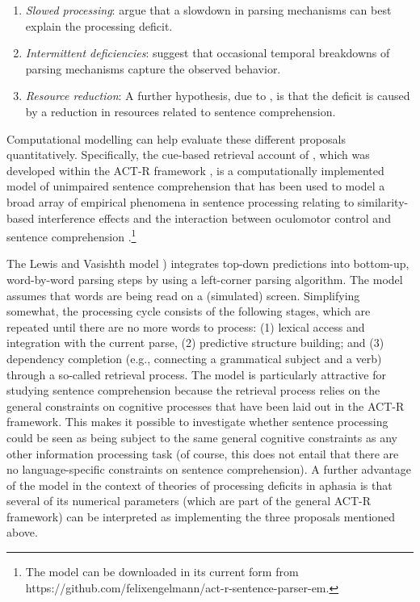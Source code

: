 \documentclass{cambridge7A}\usepackage[]{graphicx}\usepackage[]{color}
\begin{document}
\begin{enumerate}
 \item \textit{Slowed processing}:
  \cite{BurkhardtEtAl2003} argue that a slowdown in parsing mechanisms can best explain the processing deficit.  
\ \item \textit{Intermittent deficiencies}:
  \cite{CaplanEtAl2015} suggest that occasional temporal breakdowns of parsing mechanisms capture the observed behavior. 
  \item \textit{Resource reduction}:
  A further hypothesis, due to \cite{Caplan2012}, is that the deficit is caused by a reduction in resources related to sentence comprehension. 
\end{enumerate} 

Computational modelling can help evaluate these different proposals quantitatively. 
Specifically, the cue-based retrieval account of \cite{LewisVasishth2005}, which was developed within the ACT-R framework \citep{AndersonEtAl2004}, is a computationally implemented model of unimpaired sentence comprehension 
 that has been used to model a broad array of empirical phenomena in sentence processing relating to similarity-based interference effects 
\citep{NicenboimRetrieval2018,JaegerEngelmannVasishth2017,EngelmannJaegerVasishth2019} and the interaction between oculomotor control and sentence comprehension \citep{Engelmanna}.\footnote{The model can be downloaded in its current form from 
https://github.com/felixengelmann/act-r-sentence-parser-em.}

The Lewis and Vasishth model \citep[and its more recent version by][]{engelmann:phd}) integrates top-down predictions into bottom-up, word-by-word parsing steps by using a left-corner parsing algorithm. The model assumes that words are being read on a (simulated) screen. Simplifying somewhat, the processing cycle consists of the following stages, which are repeated until there are no more words to process: (1) lexical access and integration with the current parse, (2) predictive structure building; and (3) dependency completion (e.g., connecting a grammatical subject and a verb) through a so-called retrieval process. 
The \cite{LewisVasishth2005} model is particularly attractive for studying sentence comprehension because the retrieval process relies on the general constraints on cognitive processes that have been laid out in the ACT-R framework. This makes it possible to investigate whether sentence processing could be seen as being subject to the same general cognitive constraints as  any other information processing task (of course, this does not entail that there are no language-specific constraints on sentence comprehension).
A further advantage of the \cite{LewisVasishth2005} model in the context of theories of processing deficits in aphasia is that several of its numerical parameters (which are part of the general ACT-R framework) can be interpreted as implementing the three proposals mentioned above.
\end{document}
